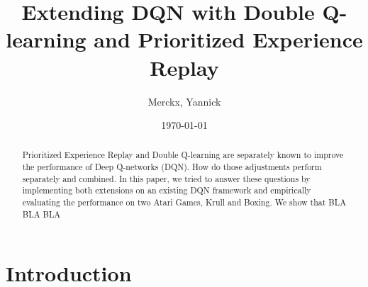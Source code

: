 \documentclass{sig-alternate}
\begin{document}
%
\crdata{ }

\title{Extending DQN with Double Q-learning and Prioritized Experience Replay}

\author{
\alignauthor Merckx, Yannick\\
}
\date{\today}


\maketitle
\begin{abstract}

Prioritized Experience Replay and Double Q-learning are separately known to improve the performance of Deep Q-networks (DQN). How do those adjustments perform separately and combined. In this paper, we tried to answer these questions by implementing both extensions on an existing DQN framework and empirically evaluating the performance on two Atari Games, Krull and Boxing. We show that  BLA BLA BLA 
\end{abstract}

\section{Introduction}
\end{document}
